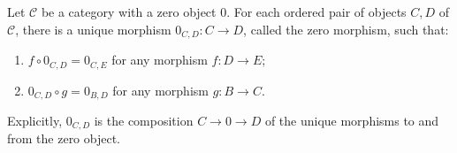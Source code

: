 Let $\mathcal{C}$ be a category with a zero object $0$. For each ordered pair of objects $C, D$ of $\mathcal{C}$, there is a unique morphism $0_{C,D} : C \to D$, called the zero morphism, such that:
\begin{enumerate}
\item[(i)] $f \circ 0_{C,D} = 0_{C,E}$ for any morphism $f : D \to E$;
\item[(ii)] $0_{C,D} \circ g = 0_{B,D}$ for any morphism $g : B \to C$.
\end{enumerate}
Explicitly, $0_{C,D}$ is the composition $C \to 0 \to D$ of the unique morphisms to and from the zero object.
